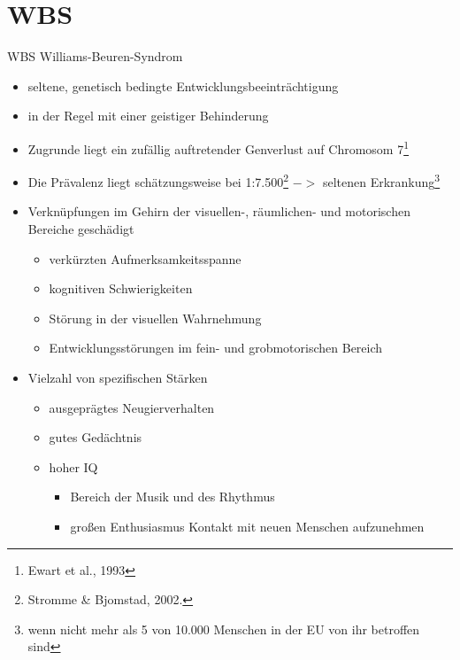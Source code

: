 \documentclass[10pt,fleqn]{beamer}
\begin{document}
\section{WBS}
\begin{frame}[t]{WBS Williams-Beuren-Syndrom}
	\begin{itemize}
		\item seltene, genetisch bedingte Entwicklungsbeeinträchtigung
		\item in der Regel mit einer geistiger Behinderung
		\item Zugrunde liegt ein zufällig auftretender Genverlust auf Chromosom 7\footnote{Ewart et al., 1993} 
		\item Die Prävalenz liegt schätzungsweise bei 1:7.500\footnote{Stromme \& Bjomstad, 2002.} $->$ seltenen Erkrankung\footnote{wenn nicht mehr als 5 von 10.000 Menschen in der EU von ihr betroffen sind}
		\item Verknüpfungen im Gehirn der visuellen-, räumlichen- und motorischen Bereiche geschädigt
		\begin{itemize}
			\item verkürzten Aufmerksamkeitsspanne
			\item kognitiven Schwierigkeiten
			\item Störung in der visuellen Wahrnehmung
			\item Entwicklungsstörungen im fein- und grobmotorischen Bereich
		\end{itemize}
		\item Vielzahl von spezifischen Stärken
		\begin{itemize}
			\item ausgeprägtes Neugierverhalten
			\item gutes Gedächtnis
			\item hoher IQ
			\begin{itemize}
				\item Bereich der Musik und des Rhythmus
				\item großen Enthusiasmus Kontakt mit neuen Menschen aufzunehmen
			\end{itemize} 
		\end{itemize} 
	\end{itemize}
\end{frame}
\end{document}
